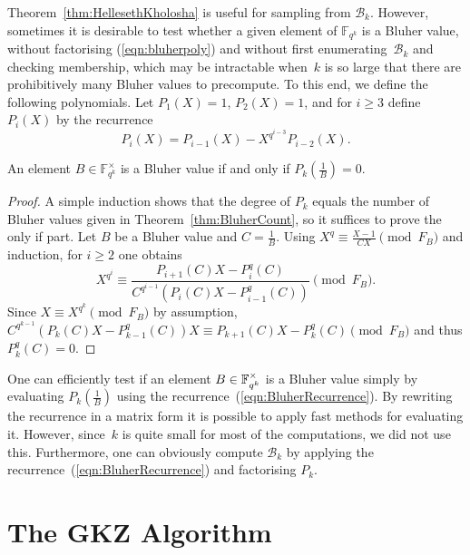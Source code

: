 \documentclass[11pt]{llncs}
\newcommand{\F}{\mathbb F}
\begin{document}
Theorem~\ref{thm:HellesethKholosha} is useful for sampling from $\mathcal{B}_k$. However, sometimes it is desirable to test whether a given element of 
$\F_{q^k}$ is a Bluher value, without factorising (\ref{eqn:bluherpoly}) and without first enumerating~$\mathcal{B}_k$ and checking membership, which 
may be intractable when~$k$ is so large that there are prohibitively many Bluher values to precompute. To this end, we define the following polynomials.
Let $P_1(X) = 1$, $P_2(X) = 1$, and for $i \ge 3$ define $P_i(X)$ by the recurrence
\begin{equation}\label{eqn:BluherRecurrence}
P_i(X) = P_{i-1}(X)  - X^{q^{i-3}} P_{i-2}(X) . 
\end{equation}

\begin{theorem}\label{thm:BluherRecurrence}
An element $B \in \F_{q^k}^{\times}$ is a Bluher value if and only if $P_k(\frac 1 B) = 0$.
\end{theorem}

\begin{proof}
  A simple induction shows that the degree of $P_k$ equals the number of
  Bluher values given in Theorem~\ref{thm:BluherCount}, so it suffices to
  prove the only if part.
  Let $B$ be a Bluher value and $C = \frac1B$.
  Using $X^q \equiv \frac{X - 1}{CX} \pmod{F_B}$ and induction, for $i \ge 2$
  one obtains
  \[ X^{q^i} \equiv \frac{P_{i+1}(C)X-P_i^q(C)}{C^{q^{i-1}} (P_i(C)X-P_{i-1}^q(C))}
  \pmod{F_B}. \]
  Since $X \equiv X^{q^k} \pmod{F_B}$ by assumption,
  $C^{q^{k-1}} (P_k(C)X-P_{k-1}^q(C)) X \equiv P_{k+1}(C)X-P_k^q(C) \pmod{F_B}$
  and thus $P_k^q(C)=0$.
\end{proof}

One can efficiently test if an element $B \in \smash{\F_{q^k}^{\times}}$ is a Bluher value simply by evaluating $P_k(\frac 1 B)$ using the
recurrence~(\ref{eqn:BluherRecurrence}). By rewriting the recurrence in a matrix form it is possible to apply fast methods for evaluating it.
However, since~$k$ is quite small for most of the computations, we did not use this. 
Furthermore, one can obviously compute $\mathcal{B}_k$ by applying the recurrence~(\ref{eqn:BluherRecurrence}) and factorising $P_k$.


\section{The GKZ Algorithm}\label{sec:GKZ}
\end{document}
